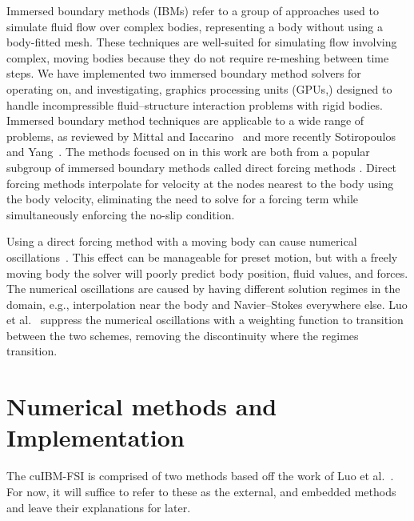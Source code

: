 Immersed boundary methods (IBMs) refer to a group of approaches used to simulate fluid flow over complex bodies, representing a body without using a body-fitted mesh. 
These techniques are well-suited for simulating flow involving complex, moving bodies because they do not require re-meshing between time steps. 
We have implemented two immersed boundary method solvers for operating on, and investigating, graphics processing units (GPUs,) designed to handle incompressible fluid--structure interaction problems with rigid bodies. 
Immersed boundary method techniques are applicable to a wide range of problems, as reviewed by Mittal and Iaccarino~\cite{Mittal:2005ii} and more recently Sotiropoulos and Yang~\cite{Sotiropoulos:2014gv}. 
The methods focused on in this work are both from a popular subgroup of immersed boundary methods called direct forcing methods \cite{MohdYusof:1997wh, Fadlun:2000fl}. 
Direct forcing methods interpolate for velocity at the nodes nearest to the body using the body velocity, eliminating the need to solve for a forcing term while simultaneously enforcing the no-slip condition.

Using a direct forcing method with a moving body can cause numerical oscillations~\cite{Sotiropoulos:2014gv,liao2010simulating,Luo:2012gx}.
This effect can be manageable for preset motion, but with a freely moving body the solver will poorly predict body position, fluid values, and forces. 
The numerical oscillations are caused by having different solution regimes in the domain, e.g., interpolation near the body and Navier--Stokes everywhere else. 
Luo et al.~\cite{Luo:2012gx} suppress the numerical oscillations with a weighting function to transition between the two schemes, removing the discontinuity where the regimes transition. 

\chapter{Numerical methods and Implementation}\label{chapter:Numerical Methods}
The cuIBM-FSI is comprised of two methods based off the work of Luo et al.~\cite{Luo:2012gx}. 
For now, it will suffice to refer to these as the external, and embedded methods and leave their explanations for later. 

